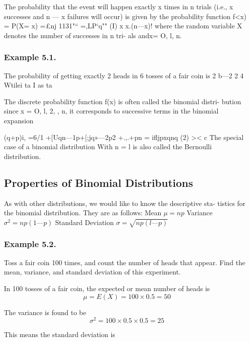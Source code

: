  The probability that the event will happen
exactly x times in n trials (i.e., x successes and n — x failures will occur)
is given by the probability function
f<x) = P(X= x) =£nj 1131"“ =,LP‘q"" (I)
x x.(n—x)!
where the random variable X denotes the number of successes in n tri-
als andx= O, l,  n.

\subsubsection*{Example 5.1. }
The probability of getting exactly 2 heads in 6 tosses
of a fair coin is
2 b—2 2 4
Wtilei ta I as ta 

The discrete probability function f(x) is often called the binomial distri-
bution since x = O, l, 2,  , n, it corresponds to successive terms in the
binomial expansion


(q+p)i, =6/1 +[Uqn—1p+[;jq»—2p2 +.,.+pn = iﬂjpxqnq (2)
><
c
The special case of a binomial distribution With n = l is also called the
Bernoulli distribution.
\subsection*{Properties of Binomial Distributions}
As with other distributions, we would like to know the descriptive sta-
tistics for the binomial distribution. They are as follows:
Mean $\mu=np$
Variance $\sigma^2 = np (1 — p)$
Standard Deviation $\sigma = \sqrt{np(l — p)}$

\subsubsection*{Example 5.2.} 
Toss a fair coin 100 times, and count the number of
heads that appear. Find the mean, variance, and standard deviation of
this experiment.

In 100 tosses of a fair coin, the expected or mean number of heads is
\[ \mu = E(X) = 100 \times 0.5 = 50\]

The variance is found to be
\[ \sigma^2 = 100 \times 0.5 \times 0.5 = 25\]

This means the standard deviation is

